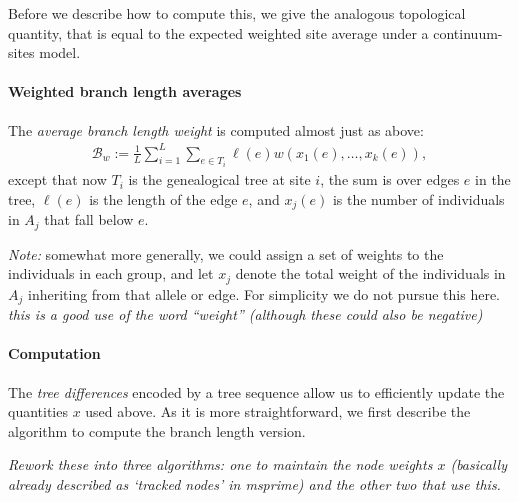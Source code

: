 \documentclass{article}
\newcommand{\branch}{\mathcal{B}} %
\newcommand{\plr}[1]{{\color{blue} \it #1}}
\begin{document}
Before we describe how to compute this,
we give the analogous topological quantity,
that is equal to the expected weighted site average
under a continuum-sites model.

\paragraph{Weighted branch length averages}
The \emph{average branch length weight}
is computed almost just as above:
\begin{align} \label{eqn:average_branch_weight}
    \branch_w :=  \frac{1}{L} \sum_{i=1}^L \sum_{e \in T_i} \ell(e) w(x_1(e), \ldots, x_k(e)) ,
\end{align}
except that now $T_i$ is the genealogical tree at site $i$,
the sum is over edges $e$ in the tree, $\ell(e)$ is the length of the edge $e$,
and $x_j(e)$ is the number of individuals in $A_j$ that fall below $e$.

\emph{Note:} somewhat more generally,
we could assign a set of weights to the individuals in each group,
and let $x_j$ denote the total weight of the individuals in $A_j$ 
inheriting from that allele or edge.
For simplicity we do not pursue this here.
\plr{this is a good use of the word ``weight'' (although these could also be negative)}


\paragraph{Computation}
The \emph{tree differences} encoded by a tree sequence allow us to efficiently update the quantities $x$ used above.
As it is more straightforward, we first describe the algorithm
to compute the branch length version.

\plr{Rework these into three algorithms: one to maintain the node weights $x$ 
    (basically already described as `tracked nodes' in msprime)
    and the other two that use this.}
\end{document}
